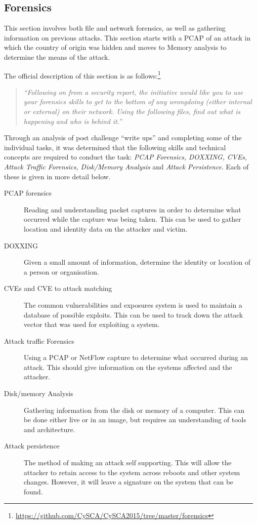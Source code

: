 \documentclass[twoside,a4paper,11pt]{report}
\begin{document}
		\subsection{Forensics}
			This section involves both file and network forensics, as well as gathering information on previous attacks. 
			This section starts with a PCAP of an attack in which the country of origin was hidden and moves to Memory analysis to determine the means of the attack. 
			
			The official description of this section is as follows:\footnote{\url{https://github.com/CySCA/CySCA2015/tree/master/forensics}}
			\begin{quote}
				\textit{``Following on from a security report, the initiative would like you to use your forensics skills to get to the bottom of any wrongdoing (either internal or external) on their network. Using the following files, find out what is happening and who is behind it.'' }
			\end{quote}
			Through an analysis of post challenge ``write ups'' and completing some of the individual tasks, 
			it was determined that the following skills and technical concepts are required to conduct the task: 
			\textit{PCAP Forensics, DOXXING, CVEs, Attack Traffic Forensics, Disk/Memory Analysis} and \textit{Attack Persistence}.
			Each of these is given in more detail below. 
			\begin{description}
				\item[PCAP forensics]
					Reading and understanding packet captures in order to determine what occurred while the capture was being taken. 
					This can be used to gather location and identity data on the attacker and victim. 
				\item[DOXXING] 
					Given a small amount of information, determine the identity or location of a person or organisation.
				\item[CVEs and CVE to attack matching]
					The common vulnerabilities and exposures system is used to maintain a database of possible exploits. 
					This can be used to track down the attack vector that was used for exploiting a system. 
				\item[Attack traffic Forensics]
					Using a PCAP or NetFlow capture to determine what occurred during an attack. 
					This should give information on the systems affected and the attacker. 
				\item[Disk/memory Analysis]
					Gathering information from the disk or memory of a computer. 
					This can be done either live or in an image, but requires an understanding of tools and architecture.
				\item[Attack persistence]
					The method of making an attack self supporting. 
					This will allow the attacker to retain access to the system across reboots and other system changes. 
					However, it will leave a signature on the system that can be found. 
			\end{description}
\end{document}
